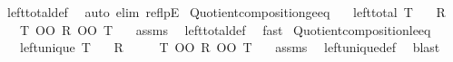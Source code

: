 \begin{isabellebody}
\ left{\isacharunderscore}{\kern0pt}total{\isacharunderscore}{\kern0pt}def\ \isamarkupfalse%
\ {\isacharparenleft}{\kern0pt}auto\ elim{\isacharcolon}{\kern0pt}\ reflpE{\isacharparenright}{\kern0pt}%
\endisatagproof
{\isafoldproof}%
%
\isadelimproof
\isanewline
%
\endisadelimproof
\isanewline
{}\isamarkupfalse%
\ Quotient{\isacharunderscore}{\kern0pt}composition{\isacharunderscore}{\kern0pt}ge{\isacharunderscore}{\kern0pt}eq{\isacharcolon}{\kern0pt}\isanewline
\ \ \ {\isachardoublequoteopen}left{\isacharunderscore}{\kern0pt}total\ T{\isachardoublequoteclose}\isanewline
\ \ \ {\isachardoublequoteopen}R\ {\isasymge}\ {\isacharparenleft}{\kern0pt}{\isacharequal}{\kern0pt}{\isacharparenright}{\kern0pt}{\isachardoublequoteclose}\isanewline
\ \ \ {\isachardoublequoteopen}{\isacharparenleft}{\kern0pt}T\ OO\ R\ OO\ T{\isasyminverse}{\isasyminverse}{\isacharparenright}{\kern0pt}\ {\isasymge}\ {\isacharparenleft}{\kern0pt}{\isacharequal}{\kern0pt}{\isacharparenright}{\kern0pt}{\isachardoublequoteclose}\isanewline
%
\isadelimproof
%
\endisadelimproof
%
\isatagproof
{}\isamarkupfalse%
\ assms\ \isamarkupfalse%
\ left{\isacharunderscore}{\kern0pt}total{\isacharunderscore}{\kern0pt}def\ \isamarkupfalse%
\ fast%
\endisatagproof
{\isafoldproof}%
%
\isadelimproof
\isanewline
%
\endisadelimproof
\isanewline
{}\isamarkupfalse%
\ Quotient{\isacharunderscore}{\kern0pt}composition{\isacharunderscore}{\kern0pt}le{\isacharunderscore}{\kern0pt}eq{\isacharcolon}{\kern0pt}\isanewline
\ \ \ {\isachardoublequoteopen}left{\isacharunderscore}{\kern0pt}unique\ T{\isachardoublequoteclose}\isanewline
\ \ \ {\isachardoublequoteopen}R\ {\isasymle}\ {\isacharparenleft}{\kern0pt}{\isacharequal}{\kern0pt}{\isacharparenright}{\kern0pt}{\isachardoublequoteclose}\isanewline
\ \ \ {\isachardoublequoteopen}{\isacharparenleft}{\kern0pt}T\ OO\ R\ OO\ T{\isasyminverse}{\isasyminverse}{\isacharparenright}{\kern0pt}\ {\isasymle}\ {\isacharparenleft}{\kern0pt}{\isacharequal}{\kern0pt}{\isacharparenright}{\kern0pt}{\isachardoublequoteclose}\isanewline
%
\isadelimproof
%
\endisadelimproof
%
\isatagproof
{}\isamarkupfalse%
\ assms\ \isamarkupfalse%
\ left{\isacharunderscore}{\kern0pt}unique{\isacharunderscore}{\kern0pt}def\ \isamarkupfalse%
\ blast%
\endisatagproof
{\isafoldproof}%
%
\isadelimproof
\isanewline
%
\endisadelimproof
\isanewline
{}\isamarkupfalse%

\end{isabellebody}
